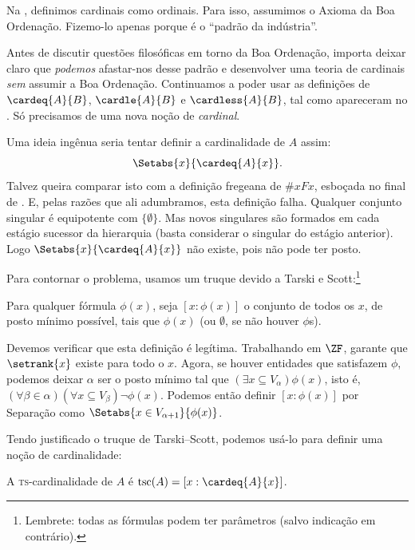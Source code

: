 \documentclass[../../../include/open-logic-section]{subfiles}
\begin{document}

Na ,
definimos cardinais como ordinais. Para isso, assumimos o Axioma da
Boa Ordenação. Fizemo-lo apenas porque é o
``padrão da indústria''.

Antes de discutir questões filosóficas em torno da
Boa Ordenação, importa deixar claro que \emph{podemos}
afastar-nos desse padrão e desenvolver uma teoria de cardinais
\emph{sem} assumir a Boa Ordenação. Continuamos a poder usar as
definições de $\cardeq{A}{B}$, $\cardle{A}{B}$ e $\cardless{A}{B}$,
tal como apareceram no . Só precisamos de uma nova
noção de \emph{cardinal}.

Uma ideia ingênua seria tentar definir a cardinalidade de $A$ assim:
\[
	\Setabs{x}{\cardeq{A}{x}}.
\]
Talvez queira comparar isto com a definição fregeana de $\# x Fx$,
esboçada no final de . E, pelas razões
que ali adumbramos, esta definição falha. Qualquer conjunto singular
é equipotente com $\{\emptyset\}$. Mas novos singulares são
formados em cada estágio sucessor da hierarquia (basta considerar o
singular do estágio anterior). Logo $\Setabs{x}{\cardeq{A}{x}}$ não
existe, pois não pode ter posto.

Para contornar o problema, usamos um truque devido a Tarski e Scott:\footnote{Lembrete: todas as fórmulas podem ter parâmetros (salvo indicação em contrário).}

\begin{defn}
Para qualquer fórmula $\phi(x)$, seja
$[ x : \phi(x)] $ o conjunto de todos os $x$, de posto mínimo possível, tais que
$\phi(x)$ (ou $\emptyset$, se não houver $\phi$s).
\end{defn}

Devemos verificar que esta definição é legítima. Trabalhando em $\ZF$,
 garante que
$\setrank{x}$ existe para todo o $x$. Agora, se houver entidades
que satisfazem $\phi$, podemos deixar $\alpha$ ser o posto mínimo tal
que  $(\exists x\subseteq V_\alpha)\phi(x)$, isto é, $(\forall \beta
\in \alpha)(\forall x \subseteq V_\beta)\lnot \phi(x)$. Podemos então
definir $[x : \phi(x)]$ por Separação como $\Setabs{x \in
V_{\alpha+1}}{\phi(x)}$. 

Tendo justificado o truque de Tarski--Scott, podemos usá-lo para definir
uma noção de cardinalidade:

\begin{defn}
A \textsc{ts}-cardinalidade de $A$ é $\text{tsc}(A) = [x :
\cardeq{A}{x}]$.
\end{defn}
\end{document}
